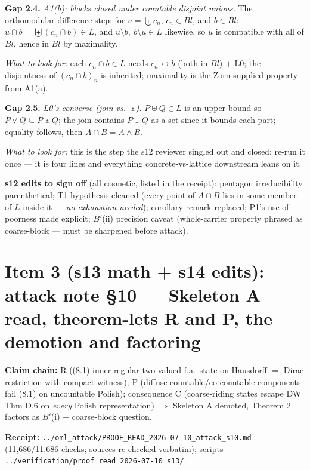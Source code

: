 \documentclass[11pt]{article}
\newcommand{\file}[1]{\texttt{\small #1}}
\newcommand{\gap}[1]{\medskip\noindent\textbf{Gap #1.}}
\newcommand{\lookfor}{\par\smallskip\noindent\emph{What to look for:} }
\begin{document}
\gap{2.4} \emph{A1(b): blocks closed under countable disjoint unions.}
The orthomodular-difference step: for $u = \biguplus c_n$, $c_n \in
Bl$, and $b \in Bl$: $u \cap b = \biguplus (c_n \cap b) \in L$, and
$u \setminus b,\ b \setminus u \in L$ likewise, so $u$ is compatible
with all of $Bl$, hence in $Bl$ by maximality.
\lookfor each $c_n \cap b \in L$ needs $c_n \leftrightarrow b$ (both
in $Bl$) $+$ L0; the disjointness of $(c_n \cap b)_n$ is inherited;
maximality is the Zorn-supplied property from A1(a).

\gap{2.5} \emph{L0's converse (join vs.\ $\uplus$).} $P \uplus Q \in
L$ is an upper bound so $P \vee Q \subseteq P \uplus Q$; the join
contains $P \cup Q$ as a set since it bounds each part; equality
follows, then $A \cap B = A \wedge B$.
\lookfor this is the step the s12 reviewer singled out and closed;
re-run it once --- it is four lines and everything concrete-vs-lattice
downstream leans on it.

\smallskip\noindent\textbf{s12 edits to sign off} (all cosmetic, listed
in the receipt): pentagon irreducibility parenthetical; T1 hypothesis
cleaned (every point of $A \cap B$ lies in some member of $L$ inside
it --- \emph{no exhaustion needed}); corollary remark replaced;
P1's use of poorness made explicit; $B'$(ii) precision caveat
(whole-carrier property phrased as coarse-block --- must be sharpened
before attack).

\section{Item 3 (s13 math + s14 edits): attack note \S10 --- Skeleton
A read, theorem-lets R and P, the demotion and factoring}

\noindent\textbf{Claim chain:} R ((8.1)-inner-regular two-valued f.a.\
state on Hausdorff $=$ Dirac restriction with compact witness); P
(diffuse countable/co-countable components fail (8.1) on uncountable
Polish); consequence C (coarse-riding states escape DW Thm D.6 on
\emph{every} Polish representation) $\Rightarrow$ Skeleton A demoted,
Theorem 2 factors as $B'$(i) $+$ coarse-block question.

\noindent\textbf{Receipt:} \file{../oml\_attack/PROOF\_READ\_2026-07-10\_attack\_s10.md}
(11{,}686/11{,}686 checks; sources re-checked verbatim);
scripts \file{../verification/proof\_read\_2026-07-10\_s13/}.
\end{document}
